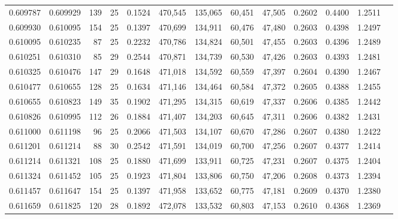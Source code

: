 \begin{tabular}{rrrrrrrrrrrrr}
0.609787 & 0.609929 &   139 &  25 &                                     0.1524 & 470,545 & 135,065 &  60,451 &  47,505 & 0.2602 & 0.4400 & 1.2511 \\
0.609930 & 0.610095 &   154 &  25 &                                     0.1397 & 470,699 & 134,911 &  60,476 &  47,480 & 0.2603 & 0.4398 & 1.2497 \\
0.610095 & 0.610235 &    87 &  25 &                                     0.2232 & 470,786 & 134,824 &  60,501 &  47,455 & 0.2603 & 0.4396 & 1.2489 \\
0.610251 & 0.610310 &    85 &  29 &                                     0.2544 & 470,871 & 134,739 &  60,530 &  47,426 & 0.2603 & 0.4393 & 1.2481 \\
0.610325 & 0.610476 &   147 &  29 &                                     0.1648 & 471,018 & 134,592 &  60,559 &  47,397 & 0.2604 & 0.4390 & 1.2467 \\
0.610477 & 0.610655 &   128 &  25 &                                     0.1634 & 471,146 & 134,464 &  60,584 &  47,372 & 0.2605 & 0.4388 & 1.2455 \\
0.610655 & 0.610823 &   149 &  35 &                                     0.1902 & 471,295 & 134,315 &  60,619 &  47,337 & 0.2606 & 0.4385 & 1.2442 \\
0.610826 & 0.610995 &   112 &  26 &                                     0.1884 & 471,407 & 134,203 &  60,645 &  47,311 & 0.2606 & 0.4382 & 1.2431 \\
0.611000 & 0.611198 &    96 &  25 &                                     0.2066 & 471,503 & 134,107 &  60,670 &  47,286 & 0.2607 & 0.4380 & 1.2422 \\
0.611201 & 0.611214 &    88 &  30 &                                     0.2542 & 471,591 & 134,019 &  60,700 &  47,256 & 0.2607 & 0.4377 & 1.2414 \\
0.611214 & 0.611321 &   108 &  25 &                                     0.1880 & 471,699 & 133,911 &  60,725 &  47,231 & 0.2607 & 0.4375 & 1.2404 \\
0.611324 & 0.611452 &   105 &  25 &                                     0.1923 & 471,804 & 133,806 &  60,750 &  47,206 & 0.2608 & 0.4373 & 1.2394 \\
0.611457 & 0.611647 &   154 &  25 &                                     0.1397 & 471,958 & 133,652 &  60,775 &  47,181 & 0.2609 & 0.4370 & 1.2380 \\
0.611659 & 0.611825 &   120 &  28 &                                     0.1892 & 472,078 & 133,532 &  60,803 &  47,153 & 0.2610 & 0.4368 & 1.2369 \\

\end{tabular}
